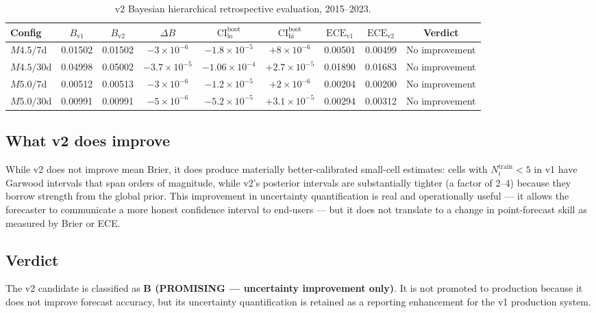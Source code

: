\documentclass[10pt,a4paper,twocolumn]{article}
\begin{document}
\begin{table}[t]
\centering
\caption{v2 Bayesian hierarchical retrospective evaluation, 2015--2023.}\label{tab:v2-results}
\small
\begin{tabular*}{\textwidth}{@{\extracolsep{\fill}}lcccccccc}
\toprule
Config & $B_{\text{v1}}$ & $B_{\text{v2}}$ & $\Delta B$ & $\text{CI}^{\text{boot}}_{\text{lo}}$ & $\text{CI}^{\text{boot}}_{\text{hi}}$ & $\text{ECE}_{\text{v1}}$ & $\text{ECE}_{\text{v2}}$ & Verdict \\
\midrule
$M4.5/7$d  & 0.01502 & 0.01502 & $-3\times10^{-6}$ & $-1.8\times10^{-5}$ & $+8\times10^{-6}$ & 0.00501 & 0.00499 & No improvement \\
$M4.5/30$d & 0.04998 & 0.05002 & $-3.7\times10^{-5}$ & $-1.06\times10^{-4}$ & $+2.7\times10^{-5}$ & 0.01890 & 0.01683 & No improvement \\
$M5.0/7$d  & 0.00512 & 0.00513 & $-3\times10^{-6}$ & $-1.2\times10^{-5}$ & $+2\times10^{-6}$ & 0.00204 & 0.00200 & No improvement \\
$M5.0/30$d & 0.00991 & 0.00991 & $-5\times10^{-6}$ & $-5.2\times10^{-5}$ & $+3.1\times10^{-5}$ & 0.00294 & 0.00312 & No improvement \\
\bottomrule
\end{tabular*}
\end{table}

\subsection{What v2 does improve}

While v2 does not improve mean Brier, it does produce materially better-calibrated small-cell estimates: cells with $N_i^{\text{train}}<5$ in v1 have Garwood intervals that span orders of magnitude, while v2's posterior intervals are substantially tighter (a factor of 2--4) because they borrow strength from the global prior. This improvement in uncertainty quantification is real and operationally useful --- it allows the forecaster to communicate a more honest confidence interval to end-users --- but it does not translate to a change in point-forecast skill as measured by Brier or ECE.

\subsection{Verdict}

The v2 candidate is classified as \textbf{B (PROMISING --- uncertainty improvement only)}. It is not promoted to production because it does not improve forecast accuracy, but its uncertainty quantification is retained as a reporting enhancement for the v1 production system.
\end{document}
